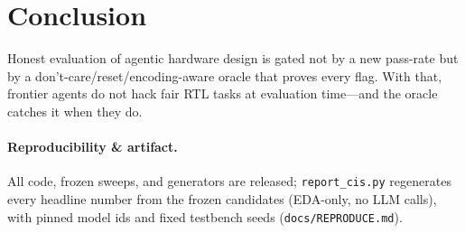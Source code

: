 \documentclass[10pt]{article}
\newcommand{\code}[1]{\texttt{#1}}
\begin{document}
\section{Conclusion}
Honest evaluation of agentic hardware design is gated not by a new pass-rate but by a
don't-care/reset/encoding-aware oracle that proves every flag. With that, frontier agents do not hack
fair RTL tasks at evaluation time---and the oracle catches it when they do.

\paragraph{Reproducibility \& artifact.} All code, frozen sweeps, and generators are released;
\code{report\_cis.py} regenerates every headline number from the frozen candidates (EDA-only, no LLM
calls), with pinned model ids and fixed testbench seeds (\code{docs/REPRODUCE.md}).
\end{document}
